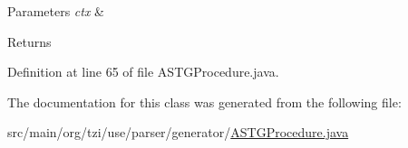 \begin{DoxyParams}{Parameters}
{\em ctx} & \\
\hline
\end{DoxyParams}
\begin{DoxyReturn}{Returns}

\end{DoxyReturn}


Definition at line 65 of file A\-S\-T\-G\-Procedure.\-java.



The documentation for this class was generated from the following file\-:\begin{DoxyCompactItemize}
\item 
src/main/org/tzi/use/parser/generator/\hyperlink{_a_s_t_g_procedure_8java}{A\-S\-T\-G\-Procedure.\-java}\end{DoxyCompactItemize}
